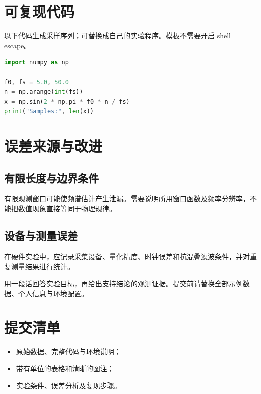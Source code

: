 \documentclass[UTF8,fontset=fandol,a4paper,zihao=-4]{ctexart}
\begin{document}
\section{可复现代码}
以下代码生成采样序列；可替换成自己的实验程序。模板不需要开启 shell escape。
\begin{lstlisting}[language=Python]
import numpy as np

f0, fs = 5.0, 50.0
n = np.arange(int(fs))
x = np.sin(2 * np.pi * f0 * n / fs)
print("Samples:", len(x))
\end{lstlisting}
\section{误差来源与改进}
\subsection{有限长度与边界条件}
有限观测窗口可能使频谱估计产生泄漏。需要说明所用窗口函数及频率分辨率，不能把数值现象直接等同于物理规律。
\subsection{设备与测量误差}
在硬件实验中，应记录采集设备、量化精度、时钟误差和抗混叠滤波条件，并对重复测量结果进行统计。
\begin{summarybox}[实验结论]
用一段话回答实验目标，再给出支持结论的观测证据。提交前请替换全部示例数据、个人信息与环境配置。
\end{summarybox}
\appendix
\section{提交清单}
\begin{itemize}
\item 原始数据、完整代码与环境说明；
\item 带有单位的表格和清晰的图注；
\item 实验条件、误差分析及复现步骤。
\end{itemize}
\end{document}
